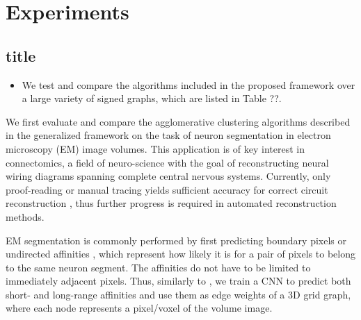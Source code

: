 
\section{Experiments}\label{sec:neuro_segm_exp}
\subsection{title}
\begin{itemize}
\item We test and compare the algorithms included in the proposed \algname{} framework over a large variety of signed graphs, which are listed in Table ??.
\end{itemize}


We first evaluate and compare the agglomerative clustering algorithms described in the generalized framework on the task of neuron segmentation in electron microscopy (EM) image volumes. This application is of key interest in connectomics, a field of neuro-science with the goal of reconstructing neural wiring diagrams spanning complete central nervous systems. Currently, only proof-reading or manual tracing yields sufficient accuracy for correct circuit reconstruction \cite{schlegel2017learning}, thus further progress is required in automated reconstruction methods.

EM segmentation is commonly performed by first predicting 
boundary pixels \cite{beier2017multicut,ciresan2012deep} or undirected affinities \cite{wolf2018mutex,lee2017superhuman,funke2018large}, which represent how likely it is for a pair of pixels to belong to the same neuron segment. 
The affinities do not have to be limited to immediately adjacent pixels.
Thus, similarly to \cite{lee2017superhuman}, we train a CNN to predict both short- and long-range affinities
and use them as edge weights of a 3D grid graph, where each node represents a pixel/voxel of the volume image. 
